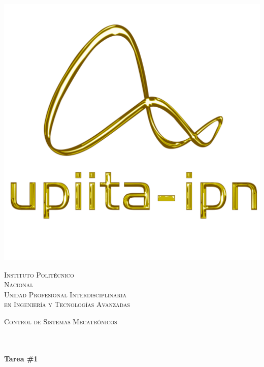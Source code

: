 \begin{center}
\begin{minipage}{0.48\textwidth}
\begin{flushright}
\includegraphics[scale = 0.3]{images/logo_upiita_oro.png}
\end{flushright}\end{minipage}


\vspace*{-2.5cm}  %

\textsc{\Huge Instituto Polit\'ecnico\\ \vspace{15pt} Nacional}\\[2cm]

\textsc{\huge Unidad Profesional Interdisciplinaria\\  \vspace{10pt} en Ingenier\'ia y Tecnolog\'ias Avanzadas}\\[2cm]

\begin{minipage}{0.9\textwidth}
\begin{center}
\textsc{\LARGE Control de Sistemas Mecatrónicos}\\
\end{center}
\end{minipage}\\[0.5cm]


\vspace*{1cm}
\HRule \\[0.4cm]
{ \huge \bfseries Tarea \#1}\\[0.4cm]
\HRule \\[1.5cm]



\end{center}
